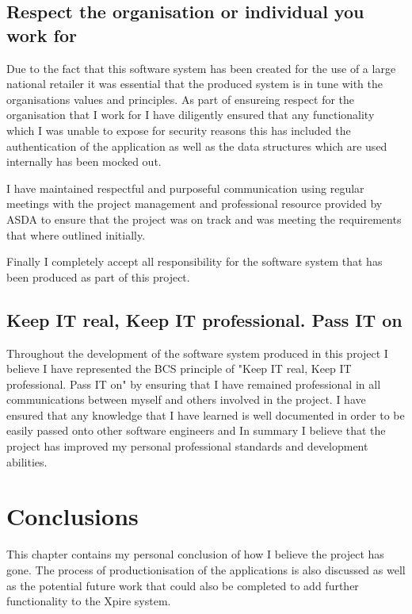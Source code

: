 \documentclass[a4paper,11pt]{report}
\begin{document}
\section{Respect the organisation or individual you work for}
Due to the fact that this software system has been created for the use of a large national retailer it was essential that the produced system is in tune with the organisations values and principles. 
As part of ensureing respect for the organisation that I work for I have diligently ensured that any functionality which I was unable to expose for security reasons this has included the authentication of the application as well as the data structures which are used internally has been mocked out.

I have maintained respectful and purposeful communication using regular meetings with the project management and professional resource provided by ASDA to ensure that the project was on track and was meeting the requirements that where outlined initially.

Finally I completely accept all responsibility for the software system that has been produced as part of this project. 

\section{Keep IT real, Keep IT professional. Pass IT on}
Throughout the development of the software system produced in this project I believe I have represented the BCS principle of 
"Keep IT real, Keep IT professional. Pass IT on" by ensuring that I have remained professional in all communications between
myself and others involved in the project. I have ensured that any knowledge that I have learned is well documented in order
to be easily passed onto other software engineers and In summary I believe that the project has improved my personal professional
standards and development abilities.

\chapter{Conclusions}
This chapter contains my personal conclusion of how I believe the project has gone. The process of productionisation of the applications is also discussed as well as the potential future work that could also be completed to add further functionality to the Xpire system. 
\end{document}
